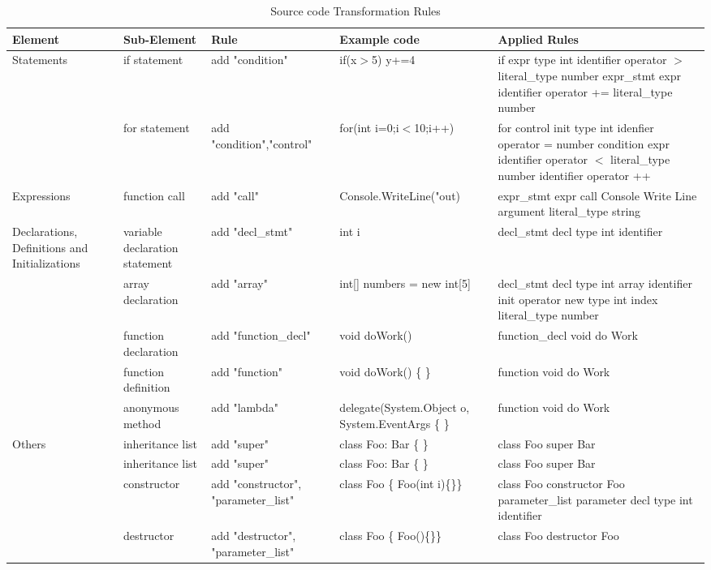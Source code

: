 \begin{table}
	\caption{Source code Transformation Rules}
	\label{tab:freq}

	\begin{tabular}{p{2cm}|l|p{3cm}|p{4cm}|p{4cm}}
	
		\hline
		Element &Sub-Element&Rule&Example code&Applied Rules\\
		\hline
		Statements & if statement & add "condition" & if(x$>$5) y+=4 & if expr type int identifier operator $>$ literal\_type number expr\_stmt expr identifier operator += literal\_type number\\\cline{2-5}
		& for statement & add "condition","control" & for(int i=0;i$<$10;i++)  & for control init type int idenfier operator = number condition expr identifier operator $<$ literal\_type number identifier operator ++\\\cline{2-5}
	
		\hline
		Expressions & function call & add "call" & Console.WriteLine("out)  & expr\_stmt expr call Console Write Line argument literal\_type string\\\cline{2-5}
		\hline
		Declarations, Definitions and Initializations & variable declaration statement& add "decl\_stmt" & int i & decl\_stmt decl type int identifier\\\cline{2-5}
		& array declaration & add "array" & int[] numbers = new int[5]& decl\_stmt decl type int array identifier init operator new type int index literal\_type number \\\cline{2-5}
		& function declaration & add "function\_decl" & void doWork()& function\_decl void do Work \\\cline{2-5}
		& function definition & add "function" & void doWork() \{ \}& function void do Work \\\cline{2-5}
		& anonymous method & add "lambda" & delegate(System.Object o, System.EventArgs \{ \} & function void do Work \\\cline{2-5}
		\hline
		Others & inheritance list & add "super" & class Foo: Bar \{ \} & class Foo super Bar\\\cline{2-5}
		& inheritance list & add "super" & class Foo: Bar \{ \} & class Foo super Bar\\\cline{2-5}
		& constructor & add "constructor", "parameter\_list" & class Foo \{ Foo(int i)\{\}\} & class Foo constructor Foo parameter\_list parameter decl type int identifier\\\cline{2-5}
		& destructor & add "destructor", "parameter\_list" & class Foo \{  Foo()\{\}\} & class Foo destructor Foo\\\cline{2-5}
		\hline
	\end{tabular}
\end{table}
